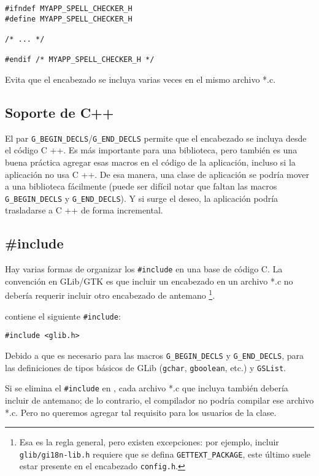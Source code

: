 \begin{lstlisting}
#ifndef MYAPP_SPELL_CHECKER_H
#define MYAPP_SPELL_CHECKER_H

/* ... */

#endif /* MYAPP_SPELL_CHECKER_H */
\end{lstlisting}

Evita que el encabezado se incluya varias veces en el mismo archivo *.c.

\subsection{Soporte de C++}
El par \lstinline{G_BEGIN_DECLS}/\lstinline{G_END_DECLS} permite que el encabezado se incluya desde el código C ++. Es más importante para una biblioteca, pero también es una buena práctica agregar esas macros en el código de la aplicación, incluso si la aplicación no usa C ++. De esa manera, una clase de aplicación se podría mover a una biblioteca fácilmente (puede ser difícil notar que faltan las macros \lstinline{G_BEGIN_DECLS} y \lstinline{G_END_DECLS}). Y si surge el deseo, la aplicación podría trasladarse a C ++ de forma incremental.

\subsection{\#include}
\label{oop-semi-include-in-header}
Hay varias formas de organizar los \lstinline{#include} en una base de código C. La convención en GLib/GTK es que incluir un encabezado en un archivo *.c no debería requerir incluir otro encabezado de antemano \footnote{Esa es la regla general, pero existen excepciones: por ejemplo, incluir \lstinline{glib/gi18n-lib.h} requiere que se defina \lstinline{GETTEXT_PACKAGE}, este último suele estar presente en el encabezado \lstinline{config.h}.}.

 contiene el siguiente \lstinline{#include}:
\begin{lstlisting}
#include <glib.h>
\end{lstlisting}

Debido a que  es necesario para las macros \lstinline{G_BEGIN_DECLS} y \lstinline{G_END_DECLS}, para las definiciones de tipos básicos de GLib (\lstinline{gchar}, \lstinline{gboolean}, etc.) y \lstinline{GSList}.

Si se elimina el \lstinline{#include} en , cada archivo *.c que incluya  también debería incluir  de antemano; de lo contrario, el compilador no podría compilar ese archivo *.c. Pero no queremos agregar tal requisito para los usuarios de la clase.

